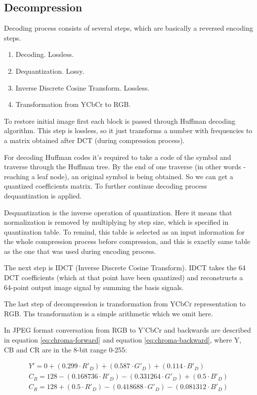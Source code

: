 \subsection{Decompression}

Decoding process consists of several steps, which are basically a reversed encoding steps.

\begin{enumerate}
    \item Decoding. Lossless.
    \item Dequantization. Lossy.
    \item Inverse Discrete Cosine Transform. Lossless.
    \item Transformation from YCbCr to RGB.
\end{enumerate}

To restore initial image first each block is passed through Huffman decoding algorithm. This step is lossless, so it just transforms a number with frequencies to a matrix obtained after DCT (during compression process).

For decoding Huffman codes it's required to take a code of the symbol and traverse through the Huffman tree. By the end of one traverse (in other words - reaching a leaf node), an original symbol is being obtained. So we can get a quantized coefficients matrix. To further continue decoding process dequantization is applied.

Dequantization is the inverse operation of quantization. Here it means that normalization is removed by multiplying by step size, which is specified in quantization table. To remind, this table is selected as an input information for the whole compression process before compression, and this is exactly same table as the one that was used during encoding process.

The next step is IDCT (Inverse Discrete Cosine Transform). IDCT takes the 64 DCT coefficients (which at that point have been quantized) and reconstructs a 64-point output image signal by summing the basis signals.

The last step of decompression is transformation from YCbCr representation to RGB. Ths transformation is a simple arithmetic which we omit here.

In JPEG format conversation from RGB to Y'CbCr and backwards are described in equation \ref{eq:chroma-forward} and equation \ref{eq:chroma-backward}, where Y, CB and CR are in the 8-bit range 0-255:

\begin{equation}
    \label{eq:chroma-forward}
    \begin{split}
        Y'=0+(0.299\cdot R'_{D})+(0.587\cdot G'_{D})+(0.114\cdot B'_{D}) \\
        C_{B}=128-(0.168736\cdot R'_{D})-(0.331264\cdot G'_{D})+(0.5\cdot B'_{D}) \\
        C_{R}=128+(0.5\cdot R'_{D})-(0.418688\cdot G'_{D})-(0.081312\cdot B'_{D})
    \end{split}
\end{equation}

